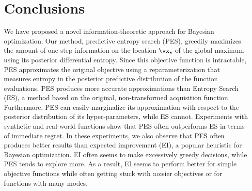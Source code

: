 \section{Conclusions}

We have proposed a novel information-theoretic approach for Bayesian
optimization. Our method, predictive entropy search (PES), greedily maximizes
the amount of one-step information on the location $\xopt$ of the global maximum
using its posterior differential entropy.  Since this objective function is
intractable, PES approximates the original objective using a reparameterization
that measures entropy in the posterior predictive distribution of the function
evaluations.  PES produces more accurate approximations than Entropy Search
(ES), a method based on the original, non-transformed acquisition function.
Furthermore, PES can easily marginalize its approximation with respect to the
posterior distribution of its hyper-parameters, while ES cannot.  Experiments
with synthetic and real-world functions show that PES often outperforms ES in
terms of immediate regret. In these experiments, we also observe that PES often
produces better results than expected improvement (EI), a popular heuristic for
Bayesian optimization.  EI often seems to make excessively greedy decisions,
while PES tends to explore more. As a result, EI seems to perform better for
simple objective functions while often getting stuck with noisier objectives or
for functions with many modes.

